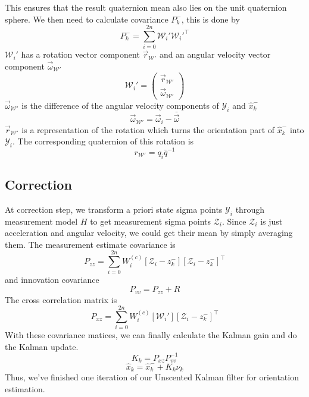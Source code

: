 \documentclass[twoside]{article}
\newcommand{\W}{\mathcal{W}}
\newcommand{\Y}{\mathcal{Y}}
\newcommand{\Z}{\mathcal{Z}}
\begin{document}
\begin{multicols}{2}
\begin{equation}
\end{equation}
This ensures that the result quaternion mean also lies on the unit quaternion sphere.
We then need to calculate covariance $P^-_k$, this is done by 
\begin{equation}
P^-_k = \sum^{2n}_{i=0}\W_i'\W_i'^\top
\end{equation}
$\W_i'$ has a rotation vector component $\vec{r}_{\W'}$ and an angular velocity vector component $\vec{\omega}_{\W'}$
\begin{equation}
\W_i'=\begin{pmatrix}\vec{r}_{\W'} \\ \vec{\omega}_{\W'}\end{pmatrix}
\end{equation}
$\vec{\omega}_{\W'}$ is the difference of the angular velocity components of $\Y_i$ and $\hat{x}^-_k$
\begin{equation}
\vec{\omega}_{\W'} = \vec{\omega}_i - \bar{\vec{\omega}}
\end{equation}
$\vec{r}_{\W'}$ is a representation of the rotation which turns the orientation part of $\hat{x}^-_k$ into $\Y_i$. The corresponding quaternion of this rotation is 
\begin{equation}
r_{\W'} = q_i \bar{q}^{-1}
\end{equation}

\subsection{Correction}
At correction step, we transform a priori state sigma points ${\Y_i}$ through measurement model $H$ to get measurement sigma points ${\Z_i}$. Since ${\Z_i}$ is just acceleration and angular velocity, we could get their mean by simply averaging them. The measurement estimate covariance is 
\begin{equation}
P_{zz} = \sum_{i=0}^{2n}W_i^{(c)}[\Z_i-z^-_k][\Z_i-z^-_k]^\top
\end{equation}
and innovation covariance 
\begin{equation}
P_{vv} = P_{zz} + R
\end{equation}
The cross correlation matrix is 
\begin{equation}
P_{xz} =  \sum_{i=0}^{2n}W_i^{(c)}[\W_i'][\Z_i-z^-_k]^\top
\end{equation}
With these covariance matices, we can finally calculate the Kalman gain and do the Kalman update.
\begin{equation}
K_k = P_{xz}P_{vv}^{-1}
\end{equation}
\begin{equation}
\hat{x}_k = \hat{x}_k^- + K_k \nu_k
\end{equation}
Thus, we've finished one iteration of our Unscented Kalman filter for orientation estimation.


\end{multicols}
\end{document}
